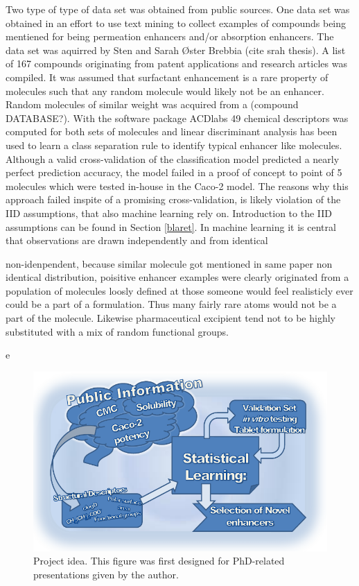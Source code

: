Two type of type of data set was obtained from public sources. One data set was obtained in an effort to use text mining to collect examples of compounds being mentiened for being permeation enhancers and/or absorption enhancers. The data set was aquirred by Sten and Sarah Øster Brebbia (cite srah thesis). A list of 167 compounds originating from patent applications and research articles was compiled. It was assumed that surfactant enhancement is a rare property of molecules such that any random molecule would likely not be an enhancer. Random molecules of similar weight was acquired from a (compound DATABASE?). With the software package ACDlabs 49 chemical descriptors was computed for both sets of molecules and linear discriminant analysis has been used to learn a class separation rule to identify typical enhancer like molecules. Although a valid cross-validation of the classification model predicted a nearly perfect prediction accuracy, the model failed in a proof of concept to point of 5 molecules which were tested in-house in the Caco-2 model. The reasons why this approach failed inspite of a promising cross-validation, is likely violation of the IID assumptions, that also machine learning rely on. Introduction to the IID assumptions can be found in Section \ref{blaret}. In machine learning it is central that observations are drawn independently and from identical 

non-idenpendent, because similar molecule got mentioned in same paper
non identical distribution, poisitive enhancer examples were clearly originated from a population of molecules loosly defined at those someone would feel realisticly ever could be a part of a formulation. Thus many fairly rare atoms would not be a part of the molecule. Likewise pharmaceutical excipient tend not to be highly substituted with a mix of random functional groups.


e
\begin{figure}[ht]
\label{workSummary}
\includegraphics{graphics/workSummary_130mm.pdf}
\caption{Project idea. This figure was first designed for PhD-related presentations given by the author.}
\end{figure}


